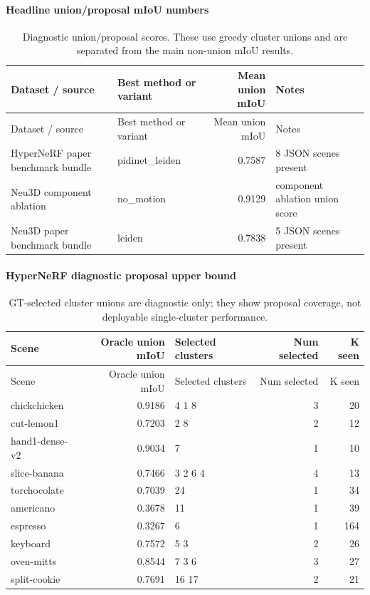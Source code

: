 \documentclass[10pt]{article}
\begin{document}
\paragraph{Headline union/proposal mIoU numbers}
\small
\begin{longtable}{llrl}
\caption{Diagnostic union/proposal scores.  These use greedy cluster unions and are separated from the main non-union mIoU results.}\\
\toprule
Dataset / source & Best method or variant & Mean union mIoU & Notes \\
\midrule
\endfirsthead
\toprule
Dataset / source & Best method or variant & Mean union mIoU & Notes \\
\midrule
\endhead
HyperNeRF paper benchmark bundle & pidinet\_leiden & 0.7587 & 8 JSON scenes present \\
Neu3D component ablation & no\_motion & 0.9129 & component ablation union score \\
Neu3D paper benchmark bundle & leiden & 0.7838 & 5 JSON scenes present \\
\bottomrule
\end{longtable}
\normalsize

\paragraph{HyperNeRF diagnostic proposal upper bound}
\small
\begin{longtable}{lrlrr}
\caption{GT-selected cluster unions are diagnostic only; they show proposal coverage, not deployable single-cluster performance.}\\
\toprule
Scene & Oracle union mIoU & Selected clusters & Num selected & K seen \\
\midrule
\endfirsthead
\toprule
Scene & Oracle union mIoU & Selected clusters & Num selected & K seen \\
\midrule
\endhead
chickchicken & 0.9186 & 4 1 8 & 3 & 20 \\
cut-lemon1 & 0.7203 & 2 8 & 2 & 12 \\
hand1-dense-v2 & 0.9034 & 7 & 1 & 10 \\
slice-banana & 0.7466 & 3 2 6 4 & 4 & 13 \\
torchocolate & 0.7039 & 24 & 1 & 34 \\
americano & 0.3678 & 11 & 1 & 39 \\
espresso & 0.3267 & 6 & 1 & 164 \\
keyboard & 0.7572 & 5 3 & 2 & 26 \\
oven-mitts & 0.8544 & 7 3 6 & 3 & 27 \\
split-cookie & 0.7691 & 16 17 & 2 & 21 \\
\bottomrule
\end{longtable}
\normalsize
\end{document}
